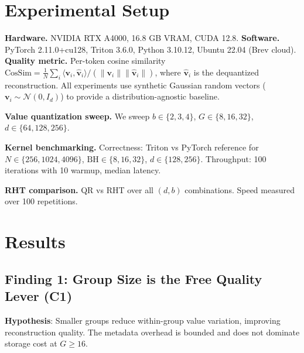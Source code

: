 \documentclass{article}
\newcommand{\bm}[1]{\boldsymbol{#1}}
\begin{document}
\section{Experimental Setup}
\label{sec:setup}

\textbf{Hardware.} NVIDIA RTX A4000, 16.8 GB VRAM, CUDA 12.8.
\textbf{Software.} PyTorch 2.11.0+cu128, Triton 3.6.0, Python 3.10.12, Ubuntu 22.04 (Brev cloud).
\textbf{Quality metric.} Per-token cosine similarity $\text{CosSim} = \frac{1}{N}\sum_i \langle \bm{v}_i, \hat{\bm{v}}_i \rangle / (\|\bm{v}_i\| \|\hat{\bm{v}}_i\|)$, where $\hat{\bm{v}}_i$ is the dequantized reconstruction. All experiments use synthetic Gaussian random vectors ($\bm{v}_i \sim \mathcal{N}(0, I_d)$) to provide a distribution-agnostic baseline.

\textbf{Value quantization sweep.} We sweep $b \in \{2, 3, 4\}$, $G \in \{8, 16, 32\}$, $d \in \{64, 128, 256\}$.

\textbf{Kernel benchmarking.} Correctness: Triton vs PyTorch reference for $N \in \{256, 1024, 4096\}$, $\text{BH} \in \{8, 16, 32\}$, $d \in \{128, 256\}$. Throughput: 100 iterations with 10 warmup, median latency.

\textbf{RHT comparison.} QR vs RHT over all $(d, b)$ combinations. Speed measured over 100 repetitions.


\section{Results}
\label{sec:results}

\subsection{Finding 1: Group Size is the Free Quality Lever (C1)}

\textbf{Hypothesis}: Smaller groups reduce within-group value variation, improving reconstruction quality. The metadata overhead is bounded and does not dominate storage cost at $G \geq 16$.
\end{document}
